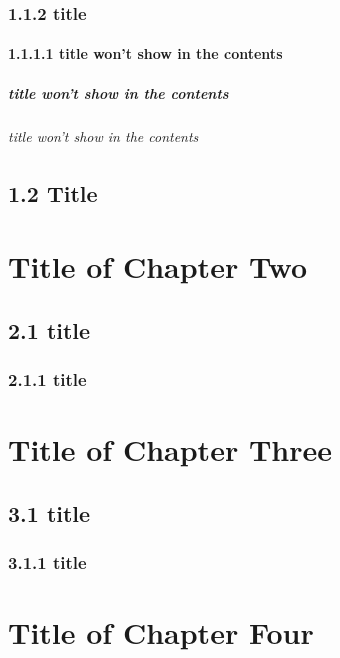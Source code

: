 \documentclass[a4paper,12pt,UTF8,openright]{book}
\begin{document}
\subsection{1.1.2 title}
\lipsum[1-5]

\subsubsection{1.1.1.1 title won't show in the contents}
\lipsum[1-5]

\paragraph{title won't show in the contents}
\lipsum[1-5]

\subparagraph{title won't show in the contents}
\lipsum[1-5]

\section{1.2 Title}
\lipsum[1-5]

\chapter{Title of Chapter Two}
\lipsum[1-5]

\section{2.1 title}
\lipsum[1-5]

\subsection{2.1.1 title}
\lipsum[1-5]

\chapter{Title of Chapter Three}
\lipsum[1-5]

\section{3.1 title}
\lipsum[1-5]

\subsection{3.1.1 title}
\lipsum[1-5]

\chapter{Title of Chapter Four}
\lipsum[1-5]
\end{document}
